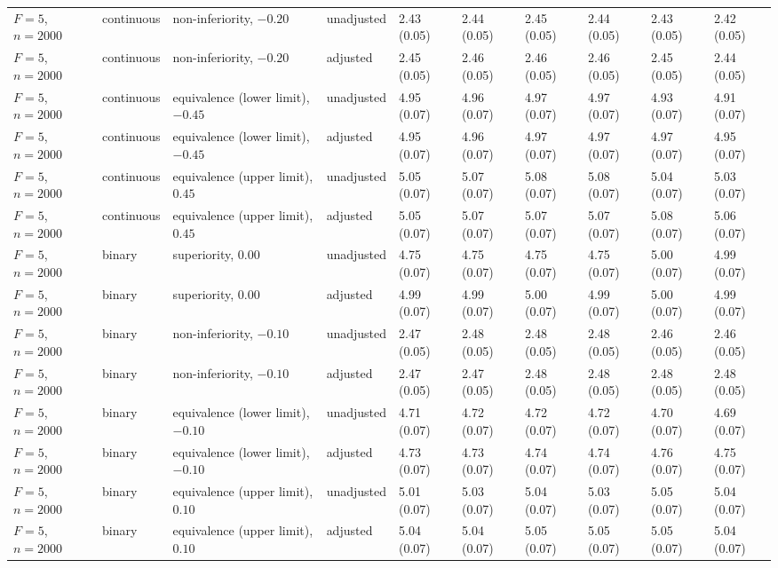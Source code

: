 \begin{landscape}
\begin{singlespace}
\begin{longtable}{@{}llllllllll@{}}
$F=5$, $n=2000$ & continuous & non-inferiority, $-0.20$ & unadjusted & 2.43 (0.05) & 2.44 (0.05) & 2.45 (0.05) & 2.44 (0.05) & 2.43 (0.05) & 2.42 (0.05)\\
$F=5$, $n=2000$ & continuous & non-inferiority, $-0.20$ & adjusted & 2.45 (0.05) & 2.46 (0.05) & 2.46 (0.05) & 2.46 (0.05) & 2.45 (0.05) & 2.44 (0.05)\\
$F=5$, $n=2000$ & continuous & equivalence (lower limit), $-0.45$ & unadjusted & 4.95 (0.07) & 4.96 (0.07) & 4.97 (0.07) & 4.97 (0.07) & 4.93 (0.07) & 4.91 (0.07)\\
$F=5$, $n=2000$ & continuous & equivalence (lower limit), $-0.45$ & adjusted & 4.95 (0.07) & 4.96 (0.07) & 4.97 (0.07) & 4.97 (0.07) & 4.97 (0.07) & 4.95 (0.07)\\
$F=5$, $n=2000$ & continuous & equivalence (upper limit), $0.45$ & unadjusted & 5.05 (0.07) & 5.07 (0.07) & 5.08 (0.07) & 5.08 (0.07) & 5.04 (0.07) & 5.03 (0.07)\\
$F=5$, $n=2000$ & continuous & equivalence (upper limit), $0.45$ & adjusted & 5.05 (0.07) & 5.07 (0.07) & 5.07 (0.07) & 5.07 (0.07) & 5.08 (0.07) & 5.06 (0.07)\\
$F=5$, $n=2000$ & binary & superiority, $0.00$ & unadjusted & 4.75 (0.07) & 4.75 (0.07) & 4.75 (0.07) & 4.75 (0.07) & 5.00 (0.07) & 4.99 (0.07)\\
$F=5$, $n=2000$ & binary & superiority, $0.00$ & adjusted & 4.99 (0.07) & 4.99 (0.07) & 5.00 (0.07) & 4.99 (0.07) & 5.00 (0.07) & 4.99 (0.07)\\
$F=5$, $n=2000$ & binary & non-inferiority, $-0.10$ & unadjusted & 2.47 (0.05) & 2.48 (0.05) & 2.48 (0.05) & 2.48 (0.05) & 2.46 (0.05) & 2.46 (0.05)\\
$F=5$, $n=2000$ & binary & non-inferiority, $-0.10$ & adjusted & 2.47 (0.05) & 2.47 (0.05) & 2.48 (0.05) & 2.48 (0.05) & 2.48 (0.05) & 2.48 (0.05)\\
$F=5$, $n=2000$ & binary & equivalence (lower limit), $-0.10$ & unadjusted & 4.71 (0.07) & 4.72 (0.07) & 4.72 (0.07) & 4.72 (0.07) & 4.70 (0.07) & 4.69 (0.07)\\
$F=5$, $n=2000$ & binary & equivalence (lower limit), $-0.10$ & adjusted & 4.73 (0.07) & 4.73 (0.07) & 4.74 (0.07) & 4.74 (0.07) & 4.76 (0.07) & 4.75 (0.07)\\
$F=5$, $n=2000$ & binary & equivalence (upper limit), $0.10$ & unadjusted & 5.01 (0.07) & 5.03 (0.07) & 5.04 (0.07) & 5.03 (0.07) & 5.05 (0.07) & 5.04 (0.07)\\
$F=5$, $n=2000$ & binary & equivalence (upper limit), $0.10$ & adjusted & 5.04 (0.07) & 5.04 (0.07) & 5.05 (0.07) & 5.05 (0.07) & 5.05 (0.07) & 5.04 (0.07)\\
\end{longtable}
\endgroup\end{singlespace}\end{landscape}
